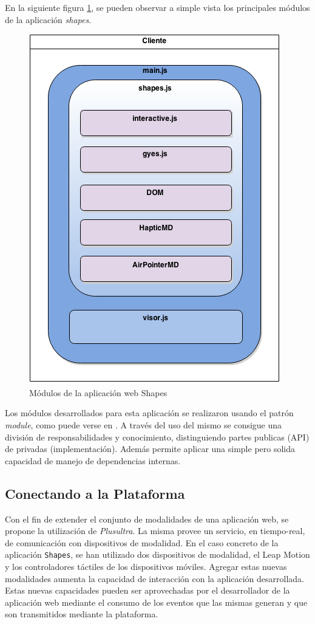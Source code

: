 En la siguiente figura \ref{fig:demo_shapes_app}, se pueden observar a simple vista los principales módulos de la aplicación \emph{shapes}.
\begin{center}
  \begin{figure}[h]
    \includegraphics[scale=0.7]{gfx/shapes_app_demo}
    \caption{Módulos de la aplicación web Shapes}
    \label{fig:demo_shapes_app}
  \end{figure}
\end{center}


Los módulos desarrollados para esta aplicación se realizaron usando el patrón \emph{module}, como puede verse en \citet{demo:module_pattern}. A través del uso del mismo se consigue una división de responsabilidades y conocimiento, distinguiendo partes publicas (API) de privadas (implementación). Además permite aplicar una simple pero solida capacidad de manejo de dependencias internas. 

\subsection{Conectando a la Plataforma}
Con el fin de extender el conjunto de modalidades de una aplicación web, se propone la utilización de \emph{Plusultra}. La misma provee un servicio, en tiempo-real, de comunicación con dispositivos de modalidad. En el caso concreto de la aplicación \texttt{Shapes}, se han utilizado dos dispositivos de modalidad, el Leap Motion y los controladores táctiles de los dispositivos móviles. Agregar estas nuevas modalidades aumenta la capacidad de interacción con la aplicación desarrollada. Estas nuevas capacidades pueden ser aprovechadas por el desarrollador de la aplicación web mediante el consumo de los eventos que las mismas generan y que son transmitidos mediante la plataforma. 

